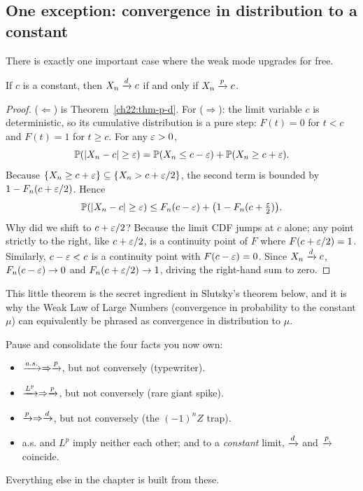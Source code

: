 \subsection{One exception: convergence in distribution to a constant}
\label{ch22:to-constant}

There is exactly one important case where the weak mode upgrades for free.

\begin{theorem}
\label{ch22:thm-const}
If $c$ is a constant, then $X_n\xrightarrow{d} c$ if and only if $X_n\xrightarrow{p} c$.
\end{theorem}

\begin{proof}
($\Leftarrow$) is Theorem~\ref{ch22:thm-p-d}. For ($\Rightarrow$): the limit variable
$c$ is deterministic, so its cumulative distribution is a pure step: $F(t) = 0$ for
$t < c$ and $F(t) = 1$ for $t \ge c$. For any $\varepsilon>0$,
\[
  \operatorname{\mathbb{P}}(\lvert X_n - c\rvert\ge\varepsilon)
  = \operatorname{\mathbb{P}}(X_n\le c-\varepsilon) + \operatorname{\mathbb{P}}(X_n\ge c+\varepsilon).
\]
Because $\{X_n \ge c+\varepsilon\} \subseteq \{X_n > c+\varepsilon/2\}$, the second term is bounded by
$1 - F_n(c+\varepsilon/2)$. Hence
\[
  \operatorname{\mathbb{P}}(\lvert X_n - c\rvert\ge\varepsilon) \le F_n(c-\varepsilon) + \big(1 - F_n(c+\tfrac{\varepsilon}{2})\big).
\]
Why did we shift to $c+\varepsilon/2$? Because the limit CDF jumps at $c$ alone; any point
strictly to the right, like $c+\varepsilon/2$, is a continuity point of $F$ where $F(c+\varepsilon/2) = 1$.
Similarly, $c-\varepsilon < c$ is a continuity point with $F(c-\varepsilon) = 0$. Since $X_n \xrightarrow{d} c$,
$F_n(c-\varepsilon) \to 0$ and $F_n(c+\varepsilon/2) \to 1$, driving the right-hand sum to zero.
\end{proof}

This little theorem is the secret ingredient in Slutsky's theorem below, and it is
why the Weak Law of Large Numbers (convergence in probability to the constant $\mu$)
can equivalently be phrased as convergence in distribution to $\mu$.

\begin{recoverybox}
Pause and consolidate the four facts you now own:
\begin{itemize}
\item $\xrightarrow{a.s.} \Rightarrow \xrightarrow{p}$, but not conversely (typewriter).
\item $\xrightarrow{L^p} \Rightarrow \xrightarrow{p}$, but not conversely (rare giant spike).
\item $\xrightarrow{p} \Rightarrow \xrightarrow{d}$, but not conversely (the $(-1)^nZ$ trap).
\item a.s. and $L^p$ imply neither each other; and to a \emph{constant} limit, $\xrightarrow{d}$
      and $\xrightarrow{p}$ coincide.
\end{itemize}
Everything else in the chapter is built from these.
\end{recoverybox}

